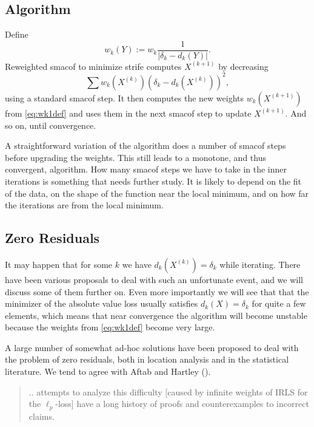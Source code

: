 \documentclass[
  12pt,
  letterpaper,
  DIV=11,
  numbers=noendperiod]{scrartcl}
\theoremstyle{plain}
\theoremstyle{remark}
\begin{document}
\subsection{Algorithm}\label{algorithm}

Define \begin{equation}
w_k(Y):=w_k\frac{1}{|\delta_k-d_k(Y)|}.\label{eq:wk1def}
\end{equation} Reweighted smacof to minimize strife computes
\(X^{(k+1)}\) by decreasing \begin{equation}
\sum w_k(X^{(k)})(\delta_k-d_k(X^{(k)}))^2,\label{eq:sstrf}
\end{equation} using a standard smacof step. It then computes the new
weights \(w_k(X^{(k+1)})\) from \eqref{eq:wk1def} and uses them in the
next smacof step to update \(X^{(k+1)}\). And so on, until convergence.

A straightforward variation of the algorithm does a number of smacof
steps before upgrading the weights. This still leads to a monotone, and
thus convergent, algorithm. How many smacof steps we have to take in the
inner iterations is something that needs further study. It is likely to
depend on the fit of the data, on the shape of the function near the
local minimum, and on how far the iterations are from the local minimum.

\subsection{Zero Residuals}\label{zero-residuals}

It may happen that for some \(k\) we have \(d_k(X^{(k)})=\delta_k\)
while iterating. There have been various proposals to deal with such an
unfortunate event, and we will discuss some of them further on. Even
more importantly we will see that that the minimizer of the absolute
value loss usually satisfies \(d_k(X)=\delta_k\) for quite a few
elements, which means that near convergence the algorithm will become
unstable because the weights from \eqref{eq:wk1def} become very large.

A large number of somewhat ad-hoc solutions have been proposed to deal
with the problem of zero residuals, both in location analysis and in the
statistical literature. We tend to agree with Aftab and Hartley
().

\begin{quote}
.. attempts to analyze this difficulty {[}caused by infinite weights of
IRLS for the \(\ell_p\)-loss{]} have a long history of proofs and
counterexamples to incorrect claims.
\end{quote}
\end{document}
